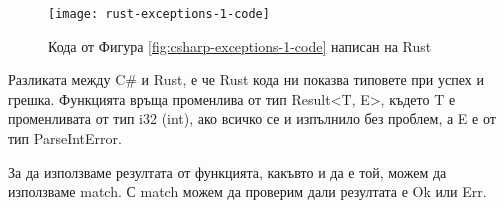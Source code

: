 \begin{figure}[!htb]
  \texttt{[image: rust-exceptions-1-code]}
  \centering
  \caption{Кода от Фигура \ref{fig:csharp-exceptions-1-code} написан на Rust}
  \label{fig:rust-exceptions-1-code}
\end{figure}

Разликата между C\# и Rust, е че Rust кода ни показва типовете при успех
и грешка. Функцията връща променлива от тип Result<T, E>, където T е
променливата от тип i32 (int), ако всичко се и изпълнило без проблем, а E е от
тип ParseIntError.

За да използваме резултата от функцията, какъвто и да е той, можем да
използваме match. С match можем да проверим дали резултата е Ok или Err.
